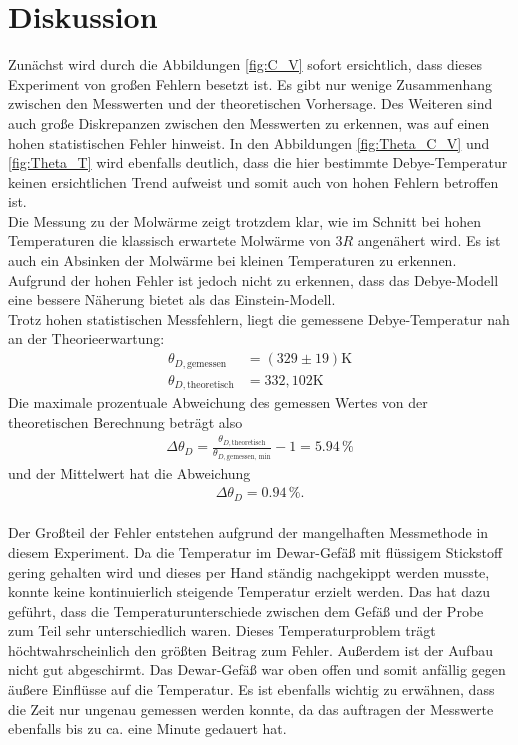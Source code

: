 \section{Diskussion}
\label{sec:Diskussion}
Zunächst wird durch die Abbildungen \ref{fig:C_V} sofort ersichtlich, dass dieses Experiment von großen Fehlern besetzt ist. 
Es gibt nur wenige Zusammenhang zwischen den Messwerten und der theoretischen Vorhersage. Des Weiteren sind 
auch große Diskrepanzen zwischen den Messwerten zu erkennen, was auf einen hohen statistischen Fehler hinweist. In den Abbildungen 
\ref{fig:Theta_C_V} und \ref{fig:Theta_T} wird ebenfalls deutlich, dass die hier bestimmte Debye-Temperatur keinen ersichtlichen Trend aufweist 
und somit auch von hohen Fehlern betroffen ist. \\
Die Messung zu der Molwärme zeigt trotzdem klar, wie im Schnitt bei hohen Temperaturen die klassisch erwartete Molwärme von $3 R$ angenähert wird. 
Es ist auch ein Absinken der Molwärme bei kleinen Temperaturen zu erkennen. Aufgrund der hohen Fehler ist jedoch nicht zu erkennen, dass das Debye-Modell eine bessere Näherung 
bietet als das Einstein-Modell.  \\

Trotz hohen statistischen Messfehlern, liegt die gemessene Debye-Temperatur nah an der Theorieerwartung:
\begin{align*}
    \theta_{D,\text{gemessen}} &= (329 \pm 19) \si{\kelvin}\\
    \theta_{D,\text{theoretisch}} &= 332,102 \si{\kelvin}
\end{align*}
Die maximale prozentuale Abweichung des gemessen Wertes von der theoretischen Berechnung beträgt also
\begin{align*}
    \Delta \theta_D =\frac{\theta_{D,\text{theoretisch}}}{\theta_{D,\text{gemessen, min}}} -1 =  5.94 \,\si{\%}
\end{align*}
und der Mittelwert hat die Abweichung
\begin{align*}
    \Delta \theta_D =  0.94 \,\si{\%}.
\end{align*}
\\ 
Der Großteil der Fehler entstehen aufgrund der mangelhaften Messmethode in diesem Experiment. Da die Temperatur im Dewar-Gefäß mit flüssigem Stickstoff 
gering gehalten wird und dieses per Hand ständig nachgekippt werden musste, konnte keine kontinuierlich steigende Temperatur erzielt werden. 
Das hat dazu geführt, dass die Temperaturunterschiede zwischen dem Gefäß und der Probe zum Teil sehr unterschiedlich waren. 
Dieses Temperaturproblem trägt höchtwahrscheinlich den größten Beitrag zum Fehler. 
Außerdem ist der Aufbau nicht gut abgeschirmt. Das Dewar-Gefäß war oben offen und somit anfällig gegen äußere Einflüsse auf die Temperatur. 
Es ist ebenfalls wichtig zu erwähnen, dass die Zeit nur ungenau gemessen werden konnte, da das auftragen der Messwerte ebenfalls bis zu ca. eine Minute gedauert hat. 
